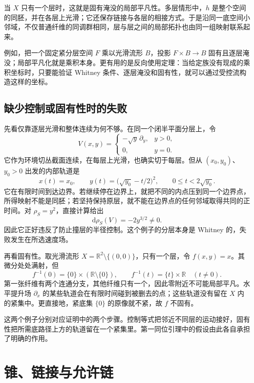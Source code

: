 当 \(X\) 只有一个层时，这就是固有淹没的局部平凡性。多层情形中，\(h\) 是整个空间的同胚，并在各层上光滑；它还保存链接与各层的相接方式。于是沿同一底空间小邻域，不仅普通纤维的同调群相同，层与层之间的局部拓扑也由同一组映射联系起来。

\ProseParagraphBreak

例如，把一个固定紧分层空间 \(F\) 乘以光滑流形 \(B\)，投影 \(F\times B\to B\) 固有且逐层淹没；局部平凡化就是乘积本身。更有用的是反向使用定理：当给定族没有现成的乘积坐标时，只要能验证 Whitney 条件、逐层淹没和固有性，就可以通过受控流构造这样的坐标。

\subsection{缺少控制或固有性时的失败}
\label{g2:subsec:B02:04}

先看仅靠逐层光滑和整体连续为何不够。在同一个闭半平面分层上，令
\[
	V(x,y)=\begin{cases}
		-\sqrt y\,\partial_y,&y>0,\\
		0,&y=0.
	\end{cases}
\]
它作为环境切丛截面连续，在每层上光滑，也确实切于每层。但从 \((x_0,y_0)\)、\(y_0>0\) 出发的内部轨道是
\[
	x(t)=x_0,\qquad
	y(t)=\bigl(\sqrt{y_0}-t/2\bigr)^2,
	\qquad 0\le t<2\sqrt{y_0}.
\]
它在有限时间到达边界。若继续停在边界上，就把不同的内点压到同一个边界点，所得映射不能是同胚；若坚持保持原层，就不能在边界点的任何邻域取得共同的正时间。对 \(\rho_S=y^2\)，直接计算给出
\[
	\mathrm{d}\rho_S(V)=-2y^{3/2}\ne0.
\]
因此它正好违反了防止撞层的半径控制。这个例子的分层本身是 Whitney 的，失败发生在所选速度场。

\ProseParagraphBreak

再看固有性。取光滑流形 \(X=\mathbb R^2\setminus\{(0,0)\}\)，只有一个层，令 \(f(x,y)=x\)。其微分处处满射，但
\[
	f^{-1}(0)=\{0\}\times(\mathbb R\setminus\{0\}),
	\qquad f^{-1}(t)=\{t\}\times\mathbb R\quad(t\ne0).
\]
第一张纤维有两个连通分支，其他纤维只有一个，因此零附近不可能局部平凡。水平提升场 \(\partial_x\) 的某些轨道会在有限时间碰到被删去的点；这些轨道没有留在 \(X\) 内的紧集中。更直接地，紧底集 \(\{0\}\) 的原像就不紧，故 \(f\) 不固有。

\ProseParagraphBreak

这两个例子分别对应证明中的两个步骤。控制等式把邻近不同层的运动接好，固有性把所需底路径上方的轨道留在一个紧集里。第一同位引理中的假设由此各自承担了明确的作用。

\section{锥、链接与允许链}
\label{g2:sec:B03}

